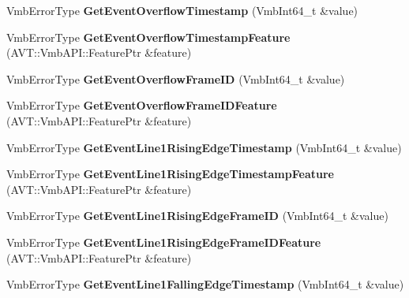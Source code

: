 \begin{DoxyCompactItemize}
\item 
\hypertarget{classMakoCamera_a12b328eff2776000b92568e551b26e7a}{Vmb\-Error\-Type {\bfseries Get\-Event\-Overflow\-Timestamp} (Vmb\-Int64\-\_\-t \&value)}\label{classMakoCamera_a12b328eff2776000b92568e551b26e7a}

\item 
\hypertarget{classMakoCamera_a0f91805708fd03ca040038681aa269c3}{Vmb\-Error\-Type {\bfseries Get\-Event\-Overflow\-Timestamp\-Feature} (A\-V\-T\-::\-Vmb\-A\-P\-I\-::\-Feature\-Ptr \&feature)}\label{classMakoCamera_a0f91805708fd03ca040038681aa269c3}

\item 
\hypertarget{classMakoCamera_a484ed8583ebf14aded2c5d9aa73c947d}{Vmb\-Error\-Type {\bfseries Get\-Event\-Overflow\-Frame\-I\-D} (Vmb\-Int64\-\_\-t \&value)}\label{classMakoCamera_a484ed8583ebf14aded2c5d9aa73c947d}

\item 
\hypertarget{classMakoCamera_a4417142b6b223dd4f0d3b3655879a9fe}{Vmb\-Error\-Type {\bfseries Get\-Event\-Overflow\-Frame\-I\-D\-Feature} (A\-V\-T\-::\-Vmb\-A\-P\-I\-::\-Feature\-Ptr \&feature)}\label{classMakoCamera_a4417142b6b223dd4f0d3b3655879a9fe}

\item 
\hypertarget{classMakoCamera_a822598f12f57532b1ec045666ba01c56}{Vmb\-Error\-Type {\bfseries Get\-Event\-Line1\-Rising\-Edge\-Timestamp} (Vmb\-Int64\-\_\-t \&value)}\label{classMakoCamera_a822598f12f57532b1ec045666ba01c56}

\item 
\hypertarget{classMakoCamera_a8ae9e3d36a8841827eb4ac683c576b56}{Vmb\-Error\-Type {\bfseries Get\-Event\-Line1\-Rising\-Edge\-Timestamp\-Feature} (A\-V\-T\-::\-Vmb\-A\-P\-I\-::\-Feature\-Ptr \&feature)}\label{classMakoCamera_a8ae9e3d36a8841827eb4ac683c576b56}

\item 
\hypertarget{classMakoCamera_a4177ba4396c63fbfb640c633f02307c0}{Vmb\-Error\-Type {\bfseries Get\-Event\-Line1\-Rising\-Edge\-Frame\-I\-D} (Vmb\-Int64\-\_\-t \&value)}\label{classMakoCamera_a4177ba4396c63fbfb640c633f02307c0}

\item 
\hypertarget{classMakoCamera_adeefda54b994309457605459e9395f25}{Vmb\-Error\-Type {\bfseries Get\-Event\-Line1\-Rising\-Edge\-Frame\-I\-D\-Feature} (A\-V\-T\-::\-Vmb\-A\-P\-I\-::\-Feature\-Ptr \&feature)}\label{classMakoCamera_adeefda54b994309457605459e9395f25}

\item 
\hypertarget{classMakoCamera_a89c83ec77ae89c60107d8e40520d527d}{Vmb\-Error\-Type {\bfseries Get\-Event\-Line1\-Falling\-Edge\-Timestamp} (Vmb\-Int64\-\_\-t \&value)}\label{classMakoCamera_a89c83ec77ae89c60107d8e40520d527d}


\end{DoxyCompactItemize}
